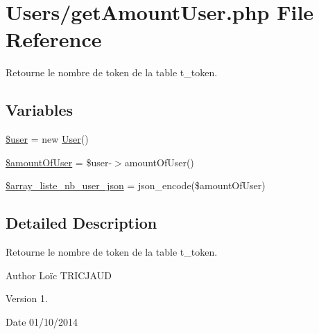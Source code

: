 \hypertarget{get_amount_user_8php}{\section{Users/get\-Amount\-User.php File Reference}
\label{get_amount_user_8php}
}


Retourne le nombre de token de la table t\-\_\-token.  


\subsection*{Variables}
\begin{DoxyCompactItemize}
\item 
\hyperlink{get_amount_user_8php_a598ca4e71b15a1313ec95f0df1027ca5}{\$user} = new \hyperlink{class_user}{User}()
\item 
\hyperlink{get_amount_user_8php_aa7f8033e965aeb22726e389f18b50fa9}{\$amount\-Of\-User} = \$user-\/$>$amount\-Of\-User()
\item 
\hyperlink{get_amount_user_8php_a87ab759433982259e3f1beb8d1143dae}{\$array\-\_\-liste\-\_\-nb\-\_\-user\-\_\-json} = json\-\_\-encode(\$amount\-Of\-User)
\end{DoxyCompactItemize}


\subsection{Detailed Description}
Retourne le nombre de token de la table t\-\_\-token. \begin{DoxyAuthor}{Author}
Loïc T\-R\-I\-C\-J\-A\-U\-D 
\end{DoxyAuthor}
\begin{DoxyVersion}{Version}
1. 
\end{DoxyVersion}
\begin{DoxyDate}{Date}
01/10/2014 
\end{DoxyDate}


